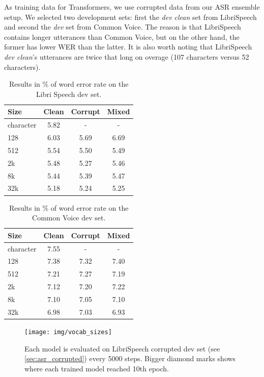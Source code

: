As training data for Transformers, we use corrupted data from our ASR ensemble setup. We selected two development sets: first the \textit{dev clean} set from LibriSpeech and second the \textit{dev} set from Common Voice. The reason is that LibriSpeech contains longer utterances than Common Voice, but on the other hand, the former has lower WER than the latter. It is also worth noting that LibriSpeech \textit{dev clean}'s utterances are twice that long on overage (107 characters versus 52 characters).


\begin{table}[p]
	\centering
	\begin{tabular}{l|ccc}
		\bf Size & \bf Clean & \bf Corrupt & \bf Mixed \\
		\hline
		character &  5.82  &  -  &  -  \\
		128 &  6.03  &  5.69  &  6.69  \\
		512 &    5.54  &  5.50   &  5.49 \\
		2k &  5.48  & 5.27  & 5.46  \\
		8k &  5.44  &   5.39 & 5.47  \\
		32k &  5.18  & 5.24  &  5.25 \\
		
	\end{tabular}
	\caption{Results in \% of word error rate on the Libri Speech dev set.}
	\label{tab:results_vocabularies_libri}
\end{table}

\begin{table}[p]
	\centering
	\begin{tabular}{l|ccc}
		\bf Size & \bf Clean & \bf Corrupt & \bf Mixed \\
		\hline
		character &  7.55  &  -  &  -  \\
		128 & 7.38   &  7.32  & 7.40  \\
		512 &  7.21  & 7.27   & 7.19  \\
		2k & 7.12   & 7.20 & 7.22  \\
		8k &  7.10  & 7.05  & 7.10  \\
		32k &  6.98  & 7.03  &  6.93 \\
		
	\end{tabular}
	\caption{Results in \% of word error rate on the Common Voice dev set.}
	\label{tab:results_vocabularies_common}
\end{table}

\begin{figure}[p]
	\texttt{[image: img/vocab\_sizes]}
	\caption{Each model is evaluated on LibriSpeech corrupted dev set (see \cref{sec:asr_corrupted}) every 5000 steps. Bigger diamond marks shows where each trained model reached 10th epoch.}
	\label{fig:vocab_sizes}
\end{figure}

